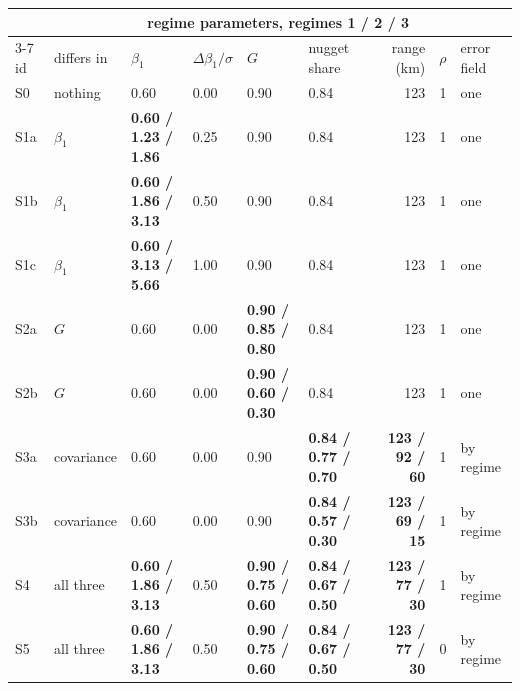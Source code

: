 \begin{tabular}{llllllrrl}
\toprule
& & \multicolumn{5}{c}{regime parameters, regimes 1 / 2 / 3} & & \\
\cmidrule(lr){3-7}
id & differs in & $\beta_1$ & $\Delta\beta_1/\sigma$ & $G$ & nugget share & range (km) & $\rho$ & error field \\
\midrule
S0 & nothing & 0.60 & 0.00 & 0.90 & 0.84 & 123 & 1 & one \\
S1a & $\beta_1$ & \textbf{0.60 / 1.23 / 1.86} & 0.25 & 0.90 & 0.84 & 123 & 1 & one \\
S1b & $\beta_1$ & \textbf{0.60 / 1.86 / 3.13} & 0.50 & 0.90 & 0.84 & 123 & 1 & one \\
S1c & $\beta_1$ & \textbf{0.60 / 3.13 / 5.66} & 1.00 & 0.90 & 0.84 & 123 & 1 & one \\
S2a & $G$ & 0.60 & 0.00 & \textbf{0.90 / 0.85 / 0.80} & 0.84 & 123 & 1 & one \\
S2b & $G$ & 0.60 & 0.00 & \textbf{0.90 / 0.60 / 0.30} & 0.84 & 123 & 1 & one \\
S3a & covariance & 0.60 & 0.00 & 0.90 & \textbf{0.84 / 0.77 / 0.70} & \textbf{123 / 92 / 60} & 1 & by regime \\
S3b & covariance & 0.60 & 0.00 & 0.90 & \textbf{0.84 / 0.57 / 0.30} & \textbf{123 / 69 / 15} & 1 & by regime \\
S4 & all three & \textbf{0.60 / 1.86 / 3.13} & 0.50 & \textbf{0.90 / 0.75 / 0.60} & \textbf{0.84 / 0.67 / 0.50} & \textbf{123 / 77 / 30} & 1 & by regime \\
S5 & all three & \textbf{0.60 / 1.86 / 3.13} & 0.50 & \textbf{0.90 / 0.75 / 0.60} & \textbf{0.84 / 0.67 / 0.50} & \textbf{123 / 77 / 30} & 0 & by regime \\
\bottomrule
\end{tabular}
